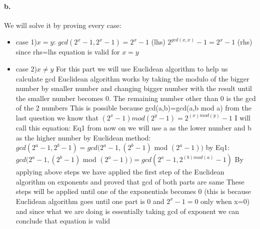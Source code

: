 \documentclass[11pt]{article}
\begin{document}
\paragraph{b.}
We will solve it by proving every case:
\begin{itemize}
\item case 1)$x=y$:
\subitem $gcd(2^{x}-1,2^{x}-1)=2^{x}-1$ (lhs)
\subitem $2^{gcd(x,x)}-1=2^{x}-1$ (rhs)
\subitem since rhs=lhs equation is valid for $x=y$

\item case 2)$x\neq y$ 
\subitem For this part we will use Euclidean algorithm to help us calculate gcd
\subitem Euclidean algorithm works by taking the modulo of the bigger number by smaller number and changing bigger number with the result until the smaller number becomes 0. The remaining number other than 0 is the gcd of the 2 numbers
\subitem This is possible because gcd(a,b)=gcd(a,b mod a)
\subitem from the last question we know that $(2^{x}-1)mod(2^{y}-1)=2^{(x)mod(y)}-1$
\subitem I will call this equation: Eq1
\subitem from now on we will use a as the lower number and b as the higher number 
\subitem by Euclidean method: $gcd(2^{a}-1,2^{b}-1)=gcd(2^{a}-1,(2^{b}-1)$ mod $(2^{a}-1))$
\subitem by Eq1: $gcd(2^{a}-1,(2^{b}-1)$ mod $(2^{a}-1))=gcd(2^{a}-1,2^{(b)mod(a)}-1)$
\subitem By applying above steps we have applied the first step of the Euclidean algorithm on exponents 
\subitem and proved that gcd of both parts are same
\subitem These steps will be applied until one of the exponentials becomes 0 (this is because Euclidean algorithm goes until one part is 0 and $2^{x}-1=0$ only when x=0)
\subitem and since what we are doing is essentially taking gcd of exponent we can conclude that equation is valid
\end{itemize}
\end{document}
